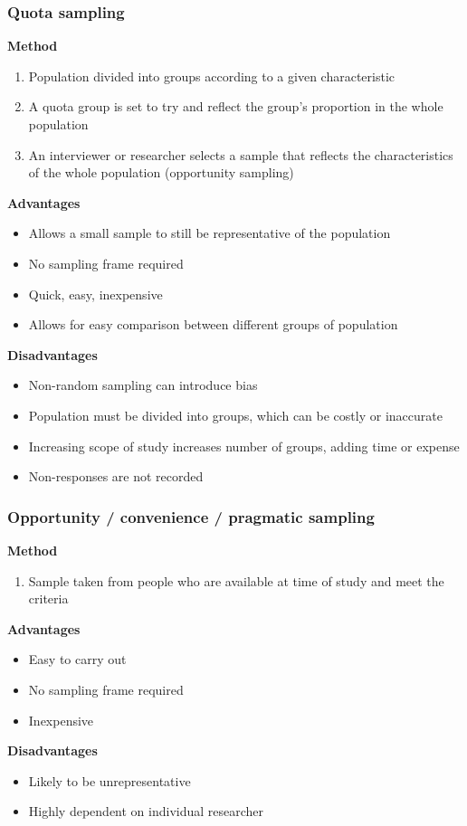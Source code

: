 \documentclass[A4paper, 11pt]{article}
\begin{document}
	\subsubsection{Quota sampling}
	\textbf{Method}
	\begin{enumerate}
		\item Population divided into groups according to a given characteristic
		\item A quota group is set to try and reflect the group's proportion in the whole population
		\item An interviewer or researcher selects a sample that reflects the characteristics of the whole population (opportunity sampling)
	\end{enumerate}
	\textbf{Advantages}
	\begin{itemize}
		\item Allows a small sample to still be representative of the population
		\item No sampling frame required
		\item Quick, easy, inexpensive
		\item Allows for easy comparison between different groups of population
	\end{itemize}
	\textbf{Disadvantages}
	\begin{itemize}
		\item Non-random sampling can introduce bias
		\item Population must be divided into groups, which can be costly or inaccurate
		\item Increasing scope of study increases number of groups, adding time or expense
		\item Non-responses are not recorded
	\end{itemize}
	
		\subsubsection{Opportunity / convenience / pragmatic sampling}
	\textbf{Method}
	\begin{enumerate}
		\item Sample taken from people who are available at time of study and meet the criteria
	\end{enumerate}
	\textbf{Advantages}
	\begin{itemize}
		\item Easy to carry out
		\item No sampling frame required
		\item Inexpensive
	\end{itemize}
	\textbf{Disadvantages}
	\begin{itemize}
		\item Likely to be unrepresentative
		\item Highly dependent on individual researcher
	\end{itemize}
	
\end{document}
